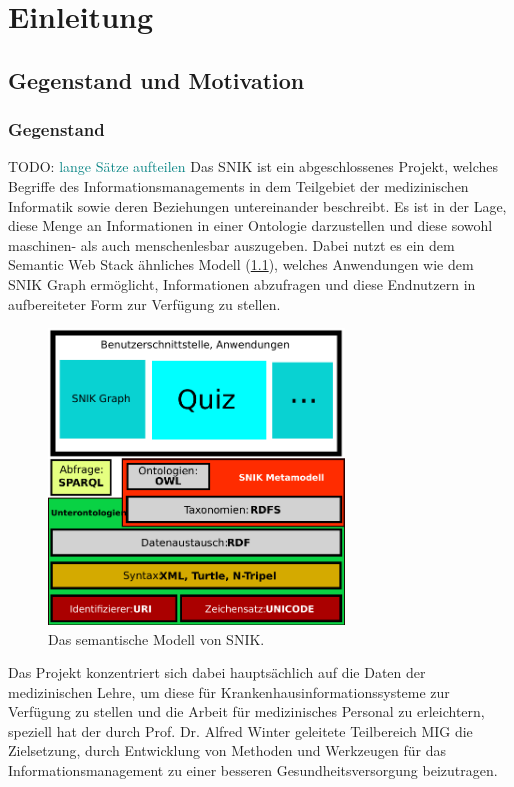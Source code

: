 \documentclass[headsepline,titlepage,ngerman,twoside,12pt]{report}
\newcommand\todo[1]{TODO: \textcolor{teal}{#1}}
\begin{document}
\chapter{Einleitung}
\section{Gegenstand und Motivation}
\subsection{Gegenstand}
\todo{lange Sätze aufteilen}
Das \ac{SNIK} ist ein abgeschlossenes Projekt, welches Begriffe des Informationsmanagements in dem Teilgebiet der  medizinischen Informatik sowie deren Beziehungen untereinander beschreibt.
Es ist in der Lage, diese Menge an Informationen in einer Ontologie darzustellen und diese sowohl maschinen- als auch menschenlesbar auszugeben.
Dabei nutzt es ein dem Semantic Web Stack ähnliches Modell (\cref{img:semanticwebstack2}), welches Anwendungen wie dem \ac{SNIK} Graph ermöglicht, Informationen abzufragen und diese Endnutzern in aufbereiteter Form zur Verfügung zu stellen.
\begin{figure}
\centering
\includegraphics[width=0.7\textwidth]{images/swebstackde_snik.pdf}
\caption{Das semantische Modell von SNIK.}
\label{img:semanticwebstack2}
\end{figure}
Das Projekt konzentriert sich dabei hauptsächlich auf die Daten der medizinischen Lehre, um diese für Krankenhausinformationssysteme zur Verfügung zu stellen und die Arbeit für medizinisches Personal zu erleichtern, speziell hat der durch Prof. Dr. Alfred Winter geleitete Teilbereich \ac{MIG} die Zielsetzung, durch Entwicklung von Methoden und Werkzeugen für das Informationsmanagement zu einer besseren Gesundheitsversorgung beizutragen.
\end{document}
